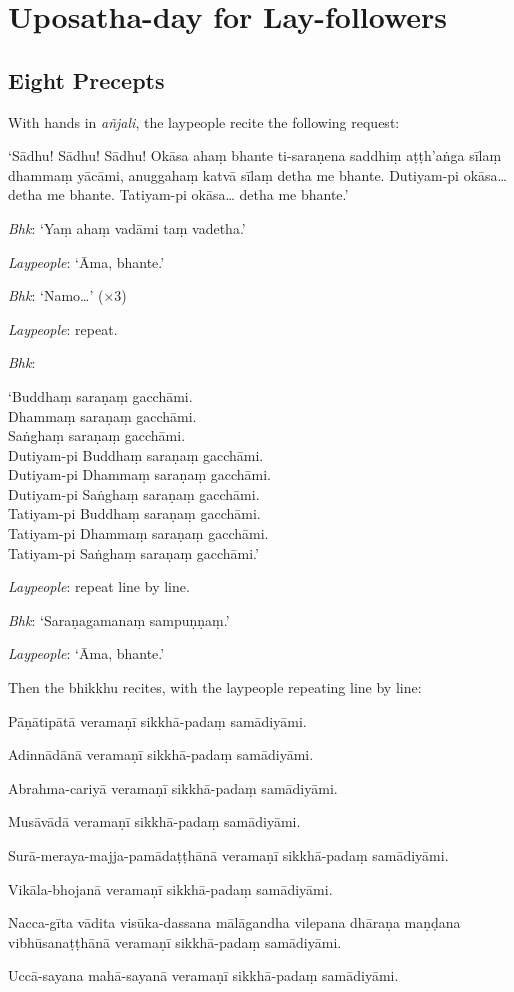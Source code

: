 \section{Uposatha-day for Lay-followers}

\subsection{Eight Precepts}

With hands in \emph{añjali}, the laypeople recite the following request:

‘Sādhu! Sādhu! Sādhu! Okāsa ahaṃ bhante ti-saraṇena saddhiṃ aṭṭh'aṅga sīlaṃ
dhammaṃ yācāmi, anuggahaṃ katvā sīlaṃ detha me bhante. Dutiyam-pi okāsa… detha
me bhante. Tatiyam-pi okāsa… detha me bhante.’

\emph{Bhk}: ‘Yaṃ ahaṃ vadāmi taṃ vadetha.’

\emph{Laypeople}: ‘Āma, bhante.’

\emph{Bhk}: ‘Namo…’ (×3)

\emph{Laypeople}: repeat.

\emph{Bhk}:

‘Buddhaṃ saraṇaṃ gacchāmi.\\
Dhammaṃ saraṇaṃ gacchāmi.\\
Saṅghaṃ saraṇaṃ gacchāmi.\\
Dutiyam-pi Buddhaṃ saraṇaṃ gacchāmi.\\
Dutiyam-pi Dhammaṃ saraṇaṃ gacchāmi.\\
Dutiyam-pi Saṅghaṃ saraṇaṃ gacchāmi.\\
Tatiyam-pi Buddhaṃ saraṇaṃ gacchāmi.\\
Tatiyam-pi Dhammaṃ saraṇaṃ gacchāmi.\\
Tatiyam-pi Saṅghaṃ saraṇaṃ gacchāmi.’

\emph{Laypeople}: repeat line by line.

\emph{Bhk}: ‘Saraṇagamanaṃ sampuṇṇaṃ.’

\emph{Laypeople}: ‘Āma, bhante.’

Then the bhikkhu recites, with the laypeople repeating line by line:

\begin{packeditemize}

\item Pāṇātipātā veramaṇī sikkhā-padaṃ samādiyāmi.
\item Adinnādānā veramaṇī sikkhā-padaṃ samādiyāmi.
\item Abrahma-cariyā veramaṇī sikkhā-padaṃ samādiyāmi.
\item Musāvādā veramaṇī sikkhā-padaṃ samādiyāmi.
\item Surā-meraya-majja-pamādaṭṭhānā veramaṇī sikkhā-padaṃ samādiyāmi.
\item Vikāla-bhojanā veramaṇī sikkhā-padaṃ samādiyāmi.
\item Nacca-gīta vādita visūka-dassana mālāgandha vilepana dhāraṇa maṇḍana vibhūsanaṭṭhānā veramaṇī sikkhā-padaṃ samādiyāmi.
\item Uccā-sayana mahā-sayanā veramaṇī sikkhā-padaṃ samādiyāmi.

\end{packeditemize}

